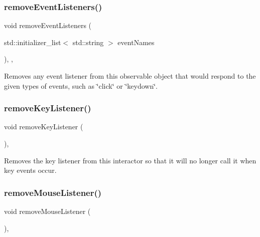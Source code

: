 \subsubsection{\texorpdfstring{remove\+Event\+Listeners()}{removeEventListeners()}}
{\footnotesize\ttfamily void remove\+Event\+Listeners (\begin{DoxyParamCaption}\item[{std\+::initializer\+\_\+list$<$ std\+::string $>$}]{event\+Names }\end{DoxyParamCaption})\hspace{0.3cm}{\ttfamily [protected]}, {\ttfamily [virtual]}, {\ttfamily [inherited]}}



Removes any event listener from this observable object that would respond to the given types of events, such as \char`\"{}click\char`\"{} or \char`\"{}keydown\char`\"{}. 

\mbox{\label{classGInteractor_a43095f41cab3be732b49f29970484b05}} 
\subsubsection{\texorpdfstring{remove\+Key\+Listener()}{removeKeyListener()}}
{\footnotesize\ttfamily void remove\+Key\+Listener (\begin{DoxyParamCaption}{ }\end{DoxyParamCaption})\hspace{0.3cm}{\ttfamily [virtual]}, {\ttfamily [inherited]}}



Removes the key listener from this interactor so that it will no longer call it when key events occur. 

\mbox{\label{classGInteractor_aff47f71ce47e688a07c9d38dc92fcc11}} 
\subsubsection{\texorpdfstring{remove\+Mouse\+Listener()}{removeMouseListener()}}
{\footnotesize\ttfamily void remove\+Mouse\+Listener (\begin{DoxyParamCaption}{ }\end{DoxyParamCaption})\hspace{0.3cm}{\ttfamily [virtual]}, {\ttfamily [inherited]}}




